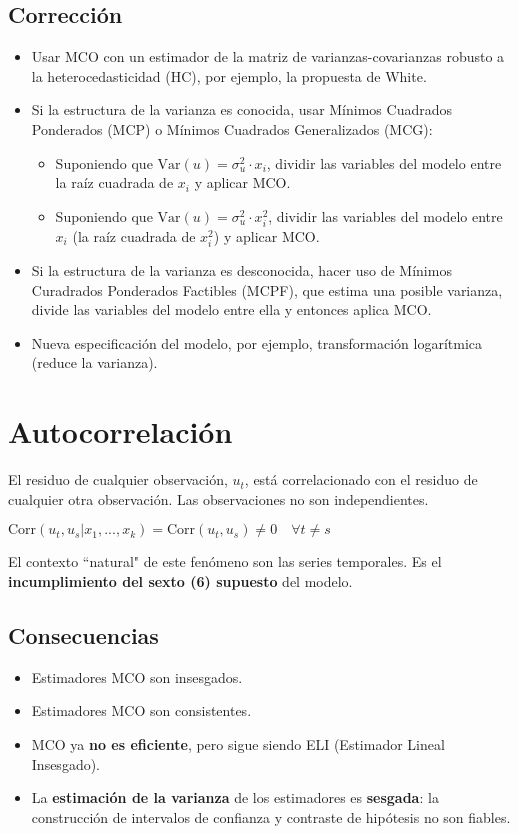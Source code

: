 \documentclass[10pt, a4paper, landscape]{extarticle}
\newcommand{\Var}{\mathrm{Var}}
\newcommand{\Corr}{\mathrm{Corr}}
\begin{document}
\begin{multicols}{3}
	\subsection*{Corrección}
		\begin{itemize}[leftmargin=*]
			\item Usar MCO con un estimador de la matriz de varianzas-covarianzas robusto a la heterocedasticidad (HC), por ejemplo, la propuesta de White.
			\item Si la estructura de la varianza es conocida, usar Mínimos Cuadrados Ponderados (MCP) o Mínimos Cuadrados Generalizados (MCG):
			\begin{itemize}[leftmargin=*]
				\item Suponiendo que $\Var(u) = \sigma^2_u \cdot x_i$, dividir las variables del modelo entre la raíz cuadrada de $x_i$ y aplicar MCO.
				\item Suponiendo que $\Var(u) = \sigma^2_u \cdot x_i^2$, dividir las variables del modelo entre $x_i$ (la raíz cuadrada de $x_i^2$) y aplicar MCO.
			\end{itemize}
			\item Si la estructura de la varianza es desconocida, hacer uso de Mínimos Curadrados Ponderados Factibles (MCPF), que estima una posible varianza, divide las variables del modelo entre ella y entonces aplica MCO.
			\item Nueva especificación del modelo, por ejemplo, transformación logarítmica (reduce la varianza).
	\end{itemize}
\columnbreak
\section*{Autocorrelación}
	El residuo de cualquier observación, $u_t$, está correlacionado con el residuo de cualquier otra observación. Las observaciones no son independientes.
	\begin{center}
		$\Corr(u_t, u_s | x_1, ..., x_k) = \Corr(u_t, u_s) \neq 0 \quad \forall t \neq s$
	\end{center}
	El contexto ``natural" de este fenómeno son las series temporales. Es el \textbf{incumplimiento del sexto (6) supuesto} del modelo.
	\subsection*{Consecuencias}
		\begin{itemize}[leftmargin=*]
			\item Estimadores MCO son insesgados.
			\item Estimadores MCO son consistentes.
			\item MCO ya \textbf{no es eficiente}, pero sigue siendo ELI (Estimador Lineal Insesgado).
			\item La \textbf{estimación de la varianza} de los estimadores es \textbf{sesgada}: la construcción de intervalos de confianza y contraste de hipótesis no son fiables.
		\end{itemize}

\end{multicols}
\end{document}
